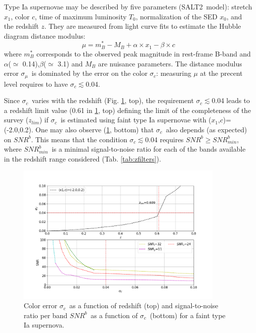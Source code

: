 \documentclass[\docopts]{\docclass}
\newcommand{\snrb}{\mbox{$SNR^b$}}
\newcommand{\snrbmin}{\mbox{$SNR^b_{min}$}}
\newcommand{\z}{{$z$}}
\newcommand{\salt}{SALT2}
\newcommand{\xnorm}{$x_0$}
\newcommand{\strech}{$x_1$}
\newcommand{\col}{$c$}
\newcommand{\daymax}{$T_0$}
\newcommand{\sigc}{\mbox{$\sigma_c$}}
\newcommand{\sigmu}{\mbox{$\sigma_\mu$}}
\newcommand{\zlim}{\mbox{$z_{lim}$}}
\begin{document}
{Type Ia supernovae may be described by five parameters (\salt~model): stretch\strech, color \col, time of maximum luminosity \daymax, normalization of the SED \xnorm, and the redshift \z.  They are measured from light curve fits to estimate the Hubble diagram distance modulus:
\begin{equation}
  \mu =m_B^*- M_B+\alpha \times x_1 -\beta \times c \label{eq:mu}
\end{equation}
where $m_B^*$ corresponds to the observed peak magnitude in rest-frame B-band and $\alpha$($\simeq$ 0.14),$\beta$($\simeq$ 3.1) and $M_B$ are nuisance parameters. The distance modulus error \sigmu~is dominated by the error on the color \sigc: measuring $\mu$ at the precent level  requires to have \sigc$\lesssim$0.04.

Since \sigc~varies with the redshift  (Fig. \ref{fig:sigc_z}, top), the requirement \sigc$\lesssim$0.04 leads to a redshift limit value (0.61 in \ref{fig:sigc_z}, top) defining the limit of the completeness of the survey (\zlim) if \sigc~is estimated using faint type Ia supernovae with (\strech,\col)=(-2.0,0.2). One may also observe (\ref{fig:sigc_z}, bottom) that \sigc~also depends (as expected) on \snrb. This means that the condition \sigc$\lesssim$0.04 requires \snrb$\geq$\snrbmin, where \snrbmin~is a minimal signal-to-noise ratio for each of the bands available in the redshift range considered (Tab. \ref{tab:zfilters}).

\begin{figure}[htbp]
\begin{center}
  \includegraphics[width=0.9\textwidth]{sigmaC_z.png}
 \caption{Color error \sigc~as a function of redshift (top) and signal-to-noise ratio per band \snrb~as a function of \sigc~(bottom) for a faint type Ia supernova.}\label{fig:sigc_z}
\end{center}
\end{figure}






}
\end{document}
